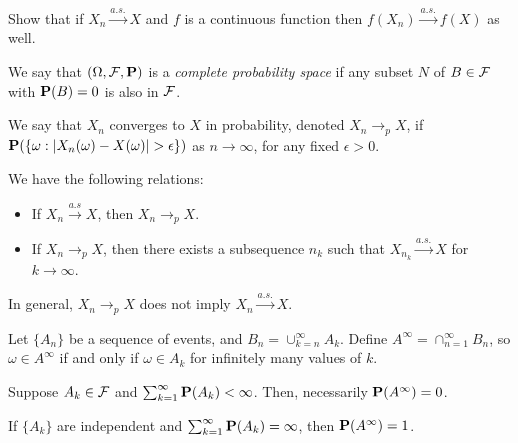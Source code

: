 \begin{exercise*}
Show that if $X_n \xrightarrow{a.s.} X$ and $f$ is a continuous function then
$f(X_n) \xrightarrow{a.s.} f(X)$ as well.
\end{exercise*}

\begin{definition*} 
We say that $(\Omega, \mathcal{F}, \mathbf{P})$ is a \emph{complete probability space} if any
subset $N$ of $B \in \mathcal{F}$ with $\mathbf{P}(B) = 0$ is also in $\mathcal{F}$.
\end{definition*} 

\begin{definition*} 
We say that $X_n$ converges to $X$ in probability, denoted $X_n \rightarrow_p
X$, if $\mathbf{P}(\{\omega: |X_n(\omega) - X(\omega)| > \epsilon\})$ as $n\rightarrow
\infty$, for any fixed $\epsilon > 0$.
\end{definition*} 

\begin{theorem*} 
We have the following relations:
\begin{itemize}
\item If $X_n \xrightarrow{a.s} X$, then $X_n \rightarrow_p X$.
\item If $X_n \rightarrow_p X$, then there exists a subsequence $n_k$ such that
$X_{n_k} \xrightarrow{a.s.} X$ for $k \rightarrow \infty$.
\end{itemize}
\end{theorem*} 

\begin{proposition*} 
In general, $X_n \rightarrow_p X$ does not imply $X_n \xrightarrow{a.s.} X$.
\end{proposition*} 

\begin{definition*} 
Let $\{A_n\}$ be a sequence of events, and $B_n = \cup_{k=n}^\infty A_k$. Define
$A^\infty = \cap_{n=1}^\infty B_n$, so $\omega \in A^\infty$ if and only if
$\omega \in A_k$ for infinitely many values of $k$.
\end{definition*} 

\begin{lemma*}
Suppose $A_k \in \mathcal{F}$ and $\sum_{k=1}^\infty \mathbf{P}(A_k) < \infty$. Then,
necessarily $\mathbf{P}(A^\infty) = 0$.
\end{lemma*} 

\begin{lemma*}
If $\{A_k\}$ are independent and $\sum_{k=1}^\infty \mathbf{P}(A_k) = \infty$, then
$\mathbf{P}(A^\infty) = 1$.
\end{lemma*} 

